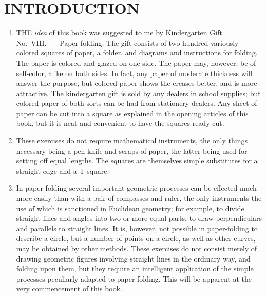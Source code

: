 
\chapter*{INTRODUCTION}

\begin{enumerate}

    \item THE \emph{idea} of this book was suggested to me by Kindergarten Gift
        No.\ VIII.\ --- Paper-folding. The gift consists of two hundred
        variously colored squares of paper, a folder, and diagrams and
        instructions for folding. The paper is colored and glazed on one side.
        The paper may, however, be of self-color, alike on both sides. In fact,
        any paper of moderate thickness will answer the purpose, but colored
        paper shows the creases better, and is more attractive. The kindergarten
        gift is sold by any dealers in school supplies; but colored paper of
        both sorts can be had from stationery dealers. Any sheet of paper can be
        cut into a square as explained in the opening articles of this book, but
        it is neat and convenient to have the squares ready cut.


    \item These exercises do not require mathematical instruments, the only
        things necessary being a pen-knife and scraps of paper, the latter being
        used for setting off equal lengths. The squares are themselves simple
        substitutes for a straight edge and a T-square.

    \item In paper-folding several important geometric processes can be effected
        much more easily than with a pair of compasses and ruler, the only
        instruments the use of which is sanctioned in Euclidean geometry; for
        example, to divide straight lines and angles into two or more equal
        parts, to draw perpendiculars and parallels to straight lines. It is,
        however, not possible in paper-folding to describe a circle, but a
        number of points on a circle, as well as other curves, may be obtained
        by other methods.  These exercises do not consist merely of drawing
        geometric figures involving straight lines in the ordinary way, and
        folding upon them, but they require an intelligent application of the
        simple processes peculiarly adapted to paper-folding. This will be
        apparent at the very commencement of this book.


\end{enumerate}
